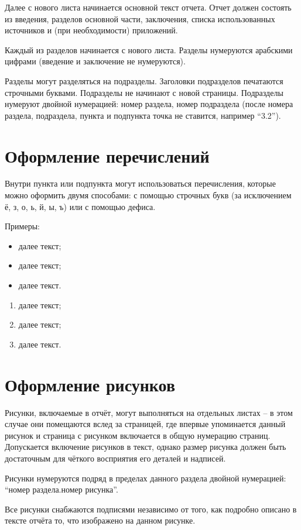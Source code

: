 \documentclass[utf8,12pt, coursreport]{G7-32}
\begin{document}
Далее с нового листа начинается основной текст отчета. Отчет должен состоять из введения, разделов основной части, заключения, списка использованных источников и (при необходимости) приложений.

Каждый из разделов начинается с нового листа. Разделы нумеруются арабскими цифрами (введение и заключение не нумеруются).

Разделы могут разделяться на подразделы. Заголовки подразделов печатаются строчными буквами. Подразделы не начинают с новой страницы. Подразделы нумеруют двойной нумерацией: номер раздела, номер подраздела (после номера раздела, подраздела, пункта и подпункта точка не ставится, например ``3.2'').

\section{Оформление перечислений}

Внутри пункта или подпункта могут использоваться перечисления, которые можно оформить двумя способами: с помощью строчных букв (за исключением ё, з, о, ь, й, ы, ъ) или с помощью дефиса.

Примеры:
\begin{itemize}
\item далее текст;
\item далее текст;
\item далее текст.
\end{itemize}
\begin{enumerate}
\item далее текст;
\item далее текст;
\item далее текст.
\end{enumerate}

\section{Оформление рисунков}

Рисунки, включаемые в отчёт, могут выполняться на отдельных листах -- в этом случае они помещаются вслед за страницей, где впервые упоминается данный рисунок и страница с рисунком включается в общую нумерацию страниц. Допускается включение рисунков в текст, однако размер рисунка должен быть достаточным для чёткого восприятия его деталей и надписей.

Рисунки нумеруются подряд в пределах данного раздела двойной нумерацией: ``номер раздела.номер рисунка''.

Все рисунки снабжаются подписями независимо от того, как подробно описано в тексте отчёта то, что изображено на данном рисунке.
\end{document}
